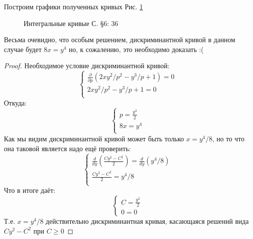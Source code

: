\documentclass{article}
\begin{document}
Построим графики полученных кривых Рис. \ref{fig:6.36}
\begin{figure}[ht]
\caption{Интегральные кривые С. \S6: 36}
\label{fig:6.36}
\end{figure}
\newline
Весьма очевидно, что особым решением, дискриминантной кривой в данном случае будет $8x=y^4$ но, к сожалению, это необходимо доказать :(
\begin{proof}
Необходимое условие дискриминантной кривой:
\begin{equation}
    \begin{cases}
    \frac{\partial}{\partial p}(2 x y^2/p^2 - y^3 /p + 1) = 0\\
    2 x y^2/ p^2 - y^3 /p + 1 = 0\\
    \end{cases}
\end{equation}
Откуда:
\begin{equation}
    \begin{cases}
    p=\frac{y^3}{2}\\
    8x=y^4\\
    \end{cases}
\end{equation}
Как мы видим дискриминантной кривой может быть только $x=y^4/8$, но то что она таковой является надо ещё проверить:
\begin{equation}
    \begin{cases}
    \frac{d}{d y}(\frac{C y^2 - C^2}{2})=\frac{d}{d y}(y^4/8)\\
    \frac{C y^2 - C^2}{2}=y^4/8\\
    \end{cases}
\end{equation}
Что в итоге даёт:
\begin{equation}
    \begin{cases}
    C=\frac{y^2}{2}\\
    0=0
    \end{cases}
\end{equation}
Т.е. $x=y^4/8$ действительно дискриминантная кривая, касающаяся решений  вида $C y^2 - C^2$ при $C \geq 0$
\end{proof}
\end{document}
